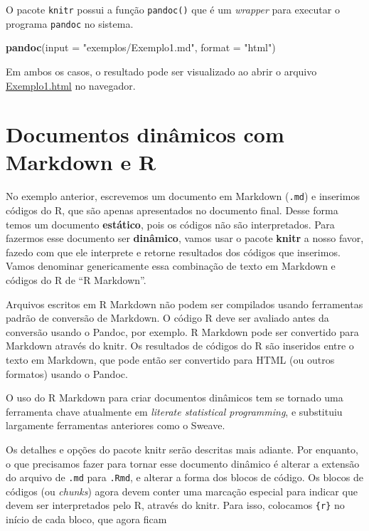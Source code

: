 \documentclass[10pt,a4paper]{book}
\newenvironment{Shaded}{\begin{snugshade}}{\end{snugshade}}
\newcommand{\KeywordTok}[1]{\textcolor[rgb]{0.13,0.29,0.53}{\textbf{#1}}}
\newcommand{\DataTypeTok}[1]{\textcolor[rgb]{0.13,0.29,0.53}{#1}}
\newcommand{\StringTok}[1]{\textcolor[rgb]{0.31,0.60,0.02}{#1}}
\newcommand{\NormalTok}[1]{#1}
\begin{document}
O pacote \texttt{knitr} possui a função \texttt{pandoc()} que é um
\emph{wrapper} para executar o programa \texttt{pandoc} no sistema.

\begin{Shaded}
\begin{Highlighting}[]
\KeywordTok{pandoc}\NormalTok{(}\DataTypeTok{input =} \StringTok{"exemplos/Exemplo1.md"}\NormalTok{, }\DataTypeTok{format =} \StringTok{"html"}\NormalTok{)}
\end{Highlighting}
\end{Shaded}

Em ambos os casos, o resultado pode ser visualizado ao abrir o arquivo
\href{exemplos/Exemplo1.html}{Exemplo1.html} no navegador.

\section{Documentos dinâmicos com Markdown e
R}\label{documentos-dinuxe2micos-com-markdown-e-r}

No exemplo anterior, escrevemos um documento em Markdown (\texttt{.md})
e inserimos códigos do R, que são apenas apresentados no documento
final. Desse forma temos um documento \textbf{estático}, pois os códigos
não são interpretados. Para fazermos esse documento ser
\textbf{dinâmico}, vamos usar o pacote \textbf{knitr} a nosso favor,
fazedo com que ele interprete e retorne resultados dos códigos que
inserimos. Vamos denominar genericamente essa combinação de texto em
Markdown e códigos do R de ``R Markdown''.

Arquivos escritos em R Markdown não podem ser compilados usando
ferramentas padrão de conversão de Markdown. O código R deve ser
avaliado antes da conversão usando o Pandoc, por exemplo. R Markdown
pode ser convertido para Markdown através do knitr. Os resultados de
códigos do R são inseridos entre o texto em Markdown, que pode então ser
convertido para HTML (ou outros formatos) usando o Pandoc.

O uso do R Markdown para criar documentos dinâmicos tem se tornado uma
ferramenta chave atualmente em \emph{literate statistical programming},
e substituiu largamente ferramentas anteriores como o Sweave.

Os detalhes e opções do pacote knitr serão descritas mais adiante. Por
enquanto, o que precisamos fazer para tornar esse documento dinâmico é
alterar a extensão do arquivo de \texttt{.md} para \texttt{.Rmd}, e
alterar a forma dos blocos de código. Os blocos de códigos (ou
\emph{chunks}) agora devem conter uma marcação especial para indicar que
devem ser interpretados pelo R, através do knitr. Para isso, colocamos
\texttt{\{r\}} no início de cada bloco, que agora ficam
\end{document}

